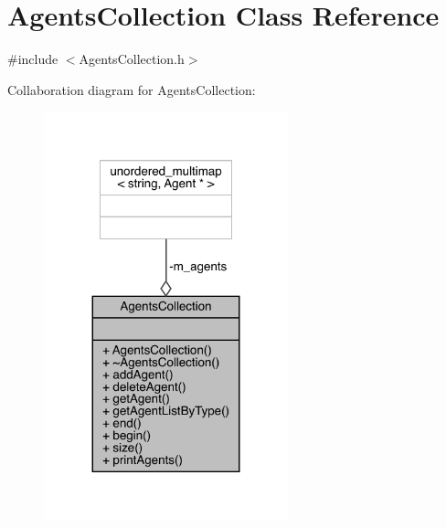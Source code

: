 \hypertarget{class_agents_collection}{}\section{Agents\+Collection Class Reference}
\label{class_agents_collection}


{\ttfamily \#include $<$Agents\+Collection.\+h$>$}



Collaboration diagram for Agents\+Collection\+:\nopagebreak
\begin{figure}[H]
\begin{center}
\leavevmode
\includegraphics[width=200pt]{class_agents_collection__coll__graph}
\end{center}
\end{figure}
